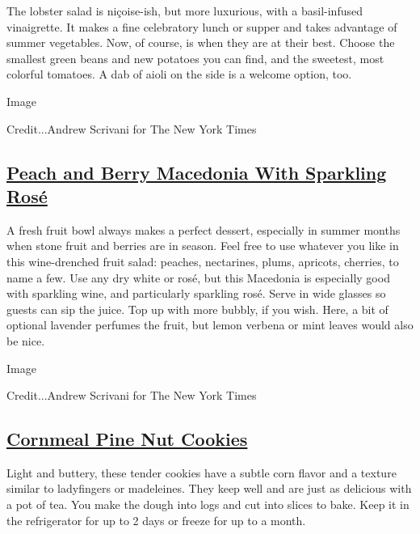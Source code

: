 The lobster salad is niçoise-ish, but more luxurious, with a
basil-infused vinaigrette. It makes a fine celebratory lunch or supper
and takes advantage of summer vegetables. Now, of course, is when they
are at their best. Choose the smallest green beans and new potatoes you
can find, and the sweetest, most colorful tomatoes. A dab of aioli on
the side is a welcome option, too.

Image

Credit...Andrew Scrivani for The New York Times

\hypertarget{peach-and-berry-macedonia-with-sparkling-rosuxe9}{%
\subsection{\texorpdfstring{\href{https://cooking.nytimes.com/recipes/1021323-peach-and-berry-macedonia-with-sparkling-rose}{Peach
and Berry Macedonia With Sparkling
Rosé}}{Peach and Berry Macedonia With Sparkling Rosé}}\label{peach-and-berry-macedonia-with-sparkling-rosuxe9}}

A fresh fruit bowl always makes a perfect dessert, especially in summer
months when stone fruit and berries are in season. Feel free to use
whatever you like in this wine-drenched fruit salad: peaches,
nectarines, plums, apricots, cherries, to name a few. Use any dry white
or rosé, but this Macedonia is especially good with sparkling wine, and
particularly sparkling rosé. Serve in wide glasses so guests can sip the
juice. Top up with more bubbly, if you wish. Here, a bit of optional
lavender perfumes the fruit, but lemon verbena or mint leaves would also
be nice.

Image

Credit...Andrew Scrivani for The New York Times

\hypertarget{cornmeal-pine-nut-cookies}{%
\subsection{\texorpdfstring{\href{https://cooking.nytimes.com/recipes/1021324-cornmeal-pine-nut-cookies}{Cornmeal
Pine Nut
Cookies}}{Cornmeal Pine Nut Cookies}}\label{cornmeal-pine-nut-cookies}}

Light and buttery, these tender cookies have a subtle corn flavor and a
texture similar to ladyfingers or madeleines. They keep well and are
just as delicious with a pot of tea. You make the dough into logs and
cut into slices to bake. Keep it in the refrigerator for up to 2 days or
freeze for up to a month.

